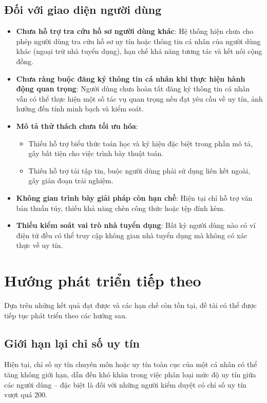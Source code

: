 \subsection{Đối với giao diện người dùng}
\begin{itemize}
  \item \textbf{Chưa hỗ trợ tra cứu hồ sơ người dùng khác}: Hệ thống hiện chưa cho phép người dùng tra cứu hồ sơ uy tín hoặc thông tin cá nhân của người dùng khác (ngoại trừ nhà tuyển dụng), hạn chế khả năng tương tác và kết nối cộng đồng.
  \item \textbf{Chưa ràng buộc đăng ký thông tin cá nhân khi thực hiện hành động quan trọng}: Người dùng chưa hoàn tất đăng ký thông tin cá nhân vẫn có thể thực hiện một số tác vụ quan trọng nếu đạt yêu cầu về uy tín, ảnh hưởng đến tính minh bạch và kiểm soát.
  \item \textbf{Mô tả thử thách chưa tối ưu hóa}:
        \begin{itemize}
          \item Thiếu hỗ trợ biểu thức toán học và ký hiệu đặc biệt trong phần mô tả, gây bất tiện cho việc trình bày thuật toán.
          \item Thiếu hỗ trợ tải tập tin, buộc người dùng phải sử dụng liên kết ngoài, gây gián đoạn trải nghiệm.
        \end{itemize}
  \item \textbf{Không gian trình bày giải pháp còn hạn chế}: Hiện tại chỉ hỗ trợ văn bản thuần túy, thiếu khả năng chèn công thức hoặc tệp đính kèm.
  \item \textbf{Thiếu kiểm soát vai trò nhà tuyển dụng}: Bất kỳ người dùng nào có ví điện tử đều có thể truy cập không gian nhà tuyển dụng mà không có xác thực về uy tín.
\end{itemize}

\section{Hướng phát triển tiếp theo}

Dựa trên những kết quả đạt được và các hạn chế còn tồn tại, đề tài có thể được tiếp tục phát triển theo các hướng sau.

\subsection{Giới hạn lại chỉ số uy tín}

Hiện tại, chỉ số uy tín chuyên môn hoặc uy tín toàn cục của một cá nhân có thể tăng không giới hạn, dẫn đến khó khăn trong việc phân loại mức độ uy tín giữa các người dùng -- đặc biệt là đối với những người kiểm duyệt có chỉ số uy tín vượt quá 200.

